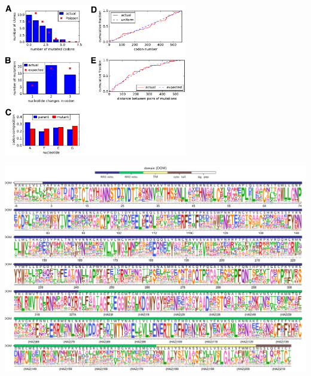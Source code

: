 \documentclass[9pt,twocolumn,twoside]{pnas-new}
\begin{document}
\begin{suppfigure}
\centerline{\includegraphics[width=0.6\textwidth]{figs/S02_SangerSeq/SangerSeq.pdf}}
\caption{\label{suppfig:SangerSeq}
{\bf Sanger sequencing of 31 randomly chosen clones from the mutant plasmid libraries.} 
(A) There were an average of $\sim$1.4 codon mutations per clone across the three plasmid mutant libraries.
(B) A mixture of one-, two-, and three-nucleotide mutations were present, with slightly fewer triple-nucleotide changes than expected.
(C) Nucleotide frequencies were uniform in the codon mutations.
(D) The mutations were distributed relatively evenly across the length of the HA coding sequence.
(E) We calculated the pairwise distances between mutations for clones carrying more than one mutation.
The cumulative distribution of these distances is shown in the red line. 
The blue line indicates the expected distribution if mutations in multiply mutated genes are randomly dispersed along the sequence. 
}
\end{suppfigure}

\begin{suppfigure}
\centerline{\includegraphics[width=\textwidth]{figs/S03_WSNprefs_logoplot/WSN-rescaled_prefs.pdf}}
\caption{\label{suppfig:WSNprefs_logoplot}
{\bf The site-specific amino-acid preferences of the WSN/1933 H1 HA.} 
The amino-acid preferences from~\cite{doud2016accurate} after taking the average of the experimental replicates and re-scaling~\cite{hilton2017phydms} by a stringency parameter of 2.05 (see \url{https://github.com/jbloomlab/dms_tools2/blob/master/examples/Doud2016/analysis_notebook.ipynb}).
The sites are in H3 numbering.
The overlays show the same information as in Figure~\ref{fig:logoplot} (domain and wildtype amino acid).
}
\end{suppfigure}
\end{document}
